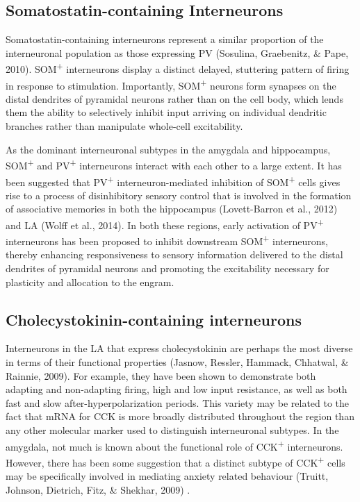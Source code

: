\documentclass[12pt,a4paperpaper,]{report}
\begin{document}
\subsection{Somatostatin-containing
Interneurons}\label{somatostatin-containing-interneurons}

Somatostatin-containing interneurons represent a similar proportion of
the interneuronal population as those expressing PV (Sosulina,
Graebenitz, \& Pape, 2010). SOM\textsuperscript{+} interneurons display
a distinct delayed, stuttering pattern of firing in response to
stimulation. Importantly, SOM\textsuperscript{+} neurons form synapses
on the distal dendrites of pyramidal neurons rather than on the cell
body, which lends them the ability to selectively inhibit input arriving
on individual dendritic branches rather than manipulate whole-cell
excitability.

As the dominant interneuronal subtypes in the amygdala and hippocampus,
SOM\textsuperscript{+} and PV\textsuperscript{+} interneurons interact
with each other to a large extent. It has been suggested that
PV\textsuperscript{+} interneuron-mediated inhibition of
SOM\textsuperscript{+} cells gives rise to a process of disinhibitory
sensory control that is involved in the formation of associative
memories in both the hippocampus (Lovett-Barron et al., 2012) and LA
(Wolff et al., 2014). In both these regions, early activation of
PV\textsuperscript{+} interneurons has been proposed to inhibit
downstream SOM\textsuperscript{+} interneurons, thereby enhancing
responsiveness to sensory information delivered to the distal dendrites
of pyramidal neurons and promoting the excitability necessary for
plasticity and allocation to the engram.

\subsection{Cholecystokinin-containing
interneurons}\label{cholecystokinin-containing-interneurons}

Interneurons in the LA that express cholecystokinin are perhaps the most
diverse in terms of their functional properties (Jasnow, Ressler,
Hammack, Chhatwal, \& Rainnie, 2009). For example, they have been shown
to demonstrate both adapting and non-adapting firing, high and low input
resistance, as well as both fast and slow after-hyperpolarization
periods. This variety may be related to the fact that mRNA for CCK is
more broadly distributed throughout the region than any other molecular
marker used to distinguish interneuronal subtypes. In the amygdala, not
much is known about the functional role of CCK\textsuperscript{+}
interneurons. However, there has been some suggestion that a distinct
subtype of CCK\textsuperscript{+} cells may be specifically involved in
mediating anxiety related behaviour (Truitt, Johnson, Dietrich, Fitz, \&
Shekhar, 2009) .
\end{document}
